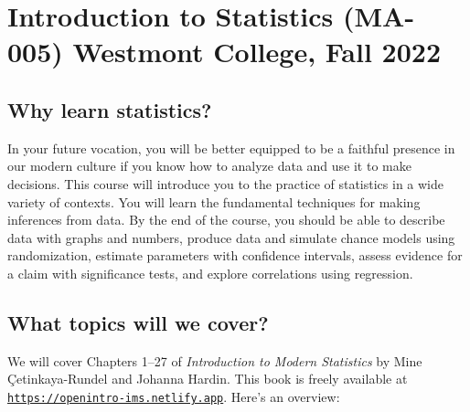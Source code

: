 \documentclass[
  twoside]{article}
\author{}
\date{\vspace{-2.5em}}
\begin{document}
\hypertarget{introduction-to-statistics-ma-005-westmont-college-fall-2022}{%
\section{Introduction to Statistics (MA-005) Westmont College, Fall
2022}\label{introduction-to-statistics-ma-005-westmont-college-fall-2022}}

\hypertarget{why-learn-statistics}{%
\subsection{Why learn statistics?}\label{why-learn-statistics}}

In your future vocation, you will be better equipped to be a faithful
presence in our modern culture if you know how to analyze data and use
it to make decisions. This course will introduce you to the practice of
statistics in a wide variety of contexts. You will learn the fundamental
techniques for making inferences from data. By the end of the course,
you should be able to describe data with graphs and numbers, produce
data and simulate chance models using randomization, estimate parameters
with confidence intervals, assess evidence for a claim with significance
tests, and explore correlations using regression.

\hypertarget{what-topics-will-we-cover}{%
\subsection{What topics will we
cover?}\label{what-topics-will-we-cover}}

We will cover Chapters 1--27 of \emph{Introduction to Modern Statistics}
by Mine Çetinkaya-Rundel and Johanna Hardin. This book is freely
available at
\href{https://openintro-ims.netlify.app/}{\texttt{https://openintro-ims.netlify.app}}.
Here's an overview:
\end{document}

